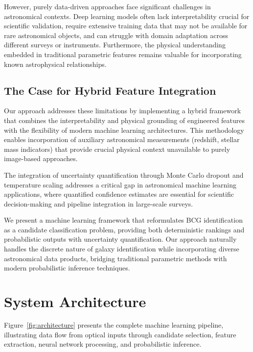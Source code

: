 \documentclass[twocolumn,10pt]{aastex631}
\begin{document}
However, purely data-driven approaches face significant challenges in astronomical contexts. Deep learning models often lack interpretability crucial for scientific validation, require extensive training data that may not be available for rare astronomical objects, and can struggle with domain adaptation across different surveys or instruments. Furthermore, the physical understanding embedded in traditional parametric features remains valuable for incorporating known astrophysical relationships.

\subsection{The Case for Hybrid Feature Integration}

Our approach addresses these limitations by implementing a hybrid framework that combines the interpretability and physical grounding of engineered features with the flexibility of modern machine learning architectures. This methodology enables incorporation of auxiliary astronomical measurements (redshift, stellar mass indicators) that provide crucial physical context unavailable to purely image-based approaches.

The integration of uncertainty quantification through Monte Carlo dropout \citep{Laves2019WellCalibratedMU} and temperature scaling addresses a critical gap in astronomical machine learning applications, where quantified confidence estimates are essential for scientific decision-making and pipeline integration in large-scale surveys.

We present a machine learning framework that reformulates BCG identification as a candidate classification problem, providing both deterministic rankings and probabilistic outputs with uncertainty quantification. Our approach naturally handles the discrete nature of galaxy identification while incorporating diverse astronomical data products, bridging traditional parametric methods with modern probabilistic inference techniques.

\section{System Architecture}

Figure~\ref{fig:architecture} presents the complete machine learning pipeline, illustrating data flow from optical inputs through candidate selection, feature extraction, neural network processing, and probabilistic inference.
\end{document}
